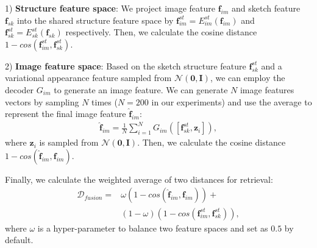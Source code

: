 \documentclass[10pt,twocolumn,letterpaper]{article}
\begin{document}
1) \textbf{Structure feature space}: We project image feature $\mathbf{f}_{im}$ and sketch feature $\mathbf{f}_{sk}$ into the shared structure feature space by $\mathbf{f}_{im}^{st}=E_{im}^{st}(\mathbf{f}_{im})$ and $\mathbf{f}_{sk}^{st}=E_{sk}^{st}(\mathbf{f}_{sk})$ respectively. Then, we calculate the cosine distance $1\!-\!cos(\mathbf{f}^{st}_{im}, \mathbf{f}^{st}_{sk})$.

2) \textbf{Image feature space}: Based on the sketch structure feature $\mathbf{f}_{sk}^{st}$ and a variational appearance feature sampled from $\mathcal{N}(\mathbf{0},\mathbf{I})$, we can employ the decoder $G_{im}$ to generate an image feature. We can generate $N$ image features vectors by sampling $N$ times ($N=200$ in our experiments) and use the average to represent the final image feature $\hat{\mathbf{f}}_{im}$:
    \vspace{-5pt}
    \begin{align}
        \hat{\mathbf{f}}_{im} = \frac{1}{N}\sum_{i=1}^{N}G_{im}([\mathbf{f}_{sk}^{st}, \mathbf{z}_i]),
    \end{align}
    where $\mathbf{z}_i$ is sampled from $\mathcal{N}(\mathbf{0},\mathbf{I})$. Then, we calculate the cosine distance $1\!-\!cos(\hat{\mathbf{f}}_{im}, \mathbf{f}_{im})$.

Finally, we calculate the weighted average of two distances for retrieval:
\vspace{-5pt}
\begin{equation}
\begin{aligned}
    \mathcal{D}_{fusion} =& \omega (1\!-\!cos(\hat{\mathbf{f}}_{im}, \mathbf{f}_{im})) +  \\
    & (1\!-\!\omega) (1\!-\!cos(\mathbf{f}^{st}_{im}, \mathbf{f}^{st}_{sk})), 
\end{aligned}
\end{equation}
where $\omega$ is a hyper-parameter to balance two feature spaces and set as $0.5$ by default.
\end{document}
